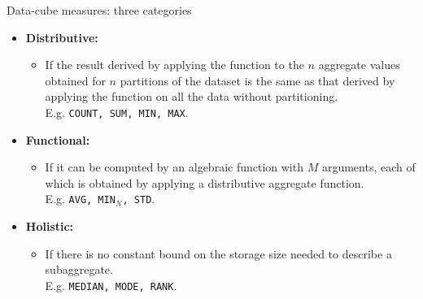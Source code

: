 \documentclass[aspectratio=169,t]{beamer}
\begin{document}
  { 
    \begin{frame}{Data-cube measures: three categories}
        \begin{itemize}
            \item \textbf{Distributive:}
            \begin{itemize}
              \item If the result derived by applying the function to the $n$ aggregate values obtained for $n$ partitions of the dataset is the same as that derived by applying the function on all the data without partitioning.\\
              E.g. \texttt{COUNT, SUM, MIN, MAX}.
            \end{itemize}
            \item \textbf{Functional:}
            \begin{itemize}
              \item If it can be computed by an algebraic function with $M$ arguments, each of which is obtained by applying a distributive aggregate function.\\
              E.g. \texttt{AVG, MIN$_N$, STD}.
            \end{itemize}
            \item \textbf{Holistic:}
            \begin{itemize}
              \item If there is no constant bound on the storage size needed to describe a subaggregate.\\
              E.g. \texttt{MEDIAN, MODE, RANK}.
            \end{itemize}
        \end{itemize}
    \end{frame}
  }
\end{document}
